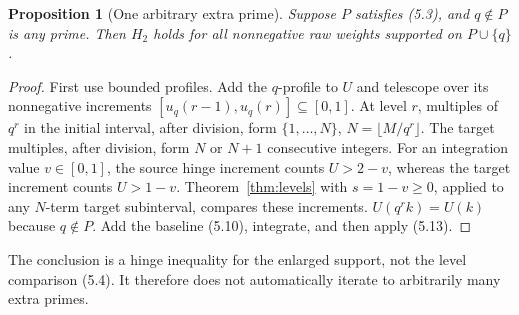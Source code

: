 \documentclass[11pt,a4paper]{article}
\newtheorem{proposition}[theorem]{Proposition}
\theoremstyle{remark}
\begin{document}
\begin{proposition}[One arbitrary extra prime]
\label{prop:anchor}
Suppose \(P\) satisfies (5.3), and \(q\notin P\) is any prime.
Then \(H_2\) holds for all nonnegative raw weights supported on
\(P\cup\{q\}\).
\end{proposition}
\begin{proof}
First use bounded profiles. Add the \(q\)-profile to \(U\) and
telescope over its nonnegative increments
\([u_q(r-1),u_q(r)]\subseteq[0,1]\). At level \(r\), multiples of
\(q^r\) in the initial interval, after division, form
\(\{1,\ldots,N\}\), \(N=\lfloor M/q^r\rfloor\).
The target multiples, after division, form \(N\) or \(N+1\)
consecutive integers. For an integration value \(v\in[0,1]\), the
source hinge increment counts \(U>2-v\), whereas the target
increment counts \(U>1-v\). Theorem~\ref{thm:levels} with
\(s=1-v\ge0\), applied to any \(N\)-term target subinterval,
compares these increments. \(U(q^rk)=U(k)\) because \(q\notin P\).
Add the baseline (5.10), integrate, and then apply (5.13).
\end{proof}

The conclusion is a hinge inequality for the enlarged support,
not the level comparison (5.4). It therefore does not automatically
iterate to arbitrarily many extra primes.
\end{document}

